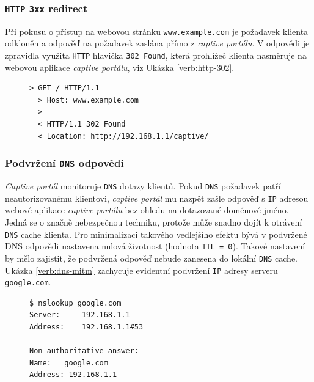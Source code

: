 \documentclass[thesis=M,czech]{FITthesis}[2012/10/20]
\renewcommand{\lstlistingname}{Ukázka kódu}
\begin{document}
\subsubsection{\texttt{HTTP} \texttt{3xx} redirect}
Při pokusu o přístup na webovou stránku \texttt{www.example.com} je požadavek klienta odkloněn a odpověď na požadavek zaslána přímo z \textit{captive portálu}. V odpovědi je zpravidla využita \texttt{HTTP} hlavička \texttt{302 Found}, která prohlížeč klienta nasměruje na webovou aplikace \textit{captive portálu}, viz Ukázka \ref{verb:http-302}.

\begin{figure}[h]
  \renewcommand{\lstlistingname}{Ukázka}
  \begin{lstlisting}[label=verb:http-302, caption={Ukázka přesměrování HTTP požadavku (zkráceno)},frame=single]
  > GET / HTTP/1.1
  > Host: www.example.com
  >
  < HTTP/1.1 302 Found
  < Location: http://192.168.1.1/captive/
  \end{lstlisting}
\end{figure}


\subsubsection{Podvržení \texttt{DNS} odpovědi}

\textit{Captive portál} monitoruje \texttt{DNS} dotazy klientů. Pokud \texttt{DNS} požadavek patří neautorizovanému klientovi, \textit{captive portál} mu nazpět zašle odpověď s \texttt{IP} adresou webové aplikace \textit{captive portálu} bez ohledu na dotazované doménové jméno. Jedná se o značně nebezpečnou techniku, protože může snadno dojít k otrávení \texttt{DNS} cache klienta. Pro minimalizaci takového vedlejšího efektu bývá v podvržené DNS odpovědi nastavena nulová životnost (hodnota \texttt{TTL = 0}). Takové nastavení by mělo zajistit, že podvržená odpověď nebude zanesena do lokální \texttt{DNS} cache. Ukázka \ref{verb:dns-mitm} zachycuje evidentní podvržení \texttt{IP} adresy serveru \texttt{google.com}.

\begin{figure}[h]
  \renewcommand{\lstlistingname}{Ukázka}
  \begin{lstlisting}[label=verb:dns-mitm, caption={Ukázka podvržení DNS odpovědi},frame=single]
$ nslookup google.com
Server:		192.168.1.1
Address:	192.168.1.1#53

Non-authoritative answer:
Name:	google.com
Address: 192.168.1.1
  \end{lstlisting}
\end{figure}
\end{document}
